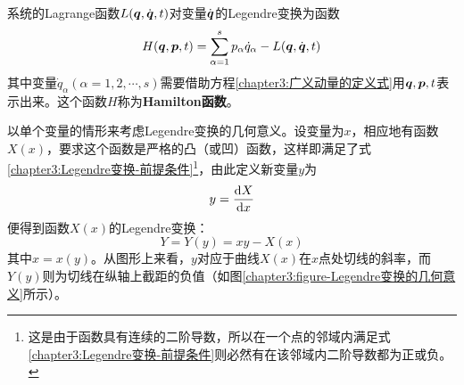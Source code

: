 系统的Lagrange函数$L(\boldsymbol{q},\dot{\boldsymbol{q}},t)$对变量$\dot{\boldsymbol{q}}$的Legendre变换为函数
\begin{equation}
	H(\boldsymbol{q},\boldsymbol{p},t) = \sum_{\alpha=1}^s p_\alpha\dot{q}_\alpha - L(\boldsymbol{q},\dot{\boldsymbol{q}},t)
	\label{chapter3:Hamilton函数定义}
\end{equation}
其中变量$\dot{q}_\alpha(\alpha=1,2,\cdots,s)$需要借助方程\eqref{chapter3:广义动量的定义式}用$\boldsymbol{q},\boldsymbol{p},t$表示出来。这个函数$H$称为{\bf Hamilton函数}。

\begin{example}[Legendre变换的几何意义]
以单个变量的情形来考虑Legendre变换的几何意义。设变量为$x$，相应地有函数$X(x)$，要求这个函数是严格的凸（或凹）函数，这样即满足了式\eqref{chapter3:Legendre变换-前提条件}\footnote{这是由于函数具有连续的二阶导数，所以在一个点的邻域内满足式\eqref{chapter3:Legendre变换-前提条件}则必然有在该邻域内二阶导数都为正或负。}，由此定义新变量$y$为
\begin{equation*}
	y = \dfrac{\mathrm{d} X}{\mathrm{d} x}
\end{equation*}
便得到函数$X(x)$的Legendre变换：
\begin{equation*}
	Y = Y(y) = xy - X(x)
\end{equation*}
其中$x=x(y)$。从图形上来看，$y$对应于曲线$X(x)$在$x$点处切线的斜率，而$Y(y)$则为切线在纵轴上截距的负值（如图\ref{chapter3:figure-Legendre变换的几何意义}所示）。


\end{example}
